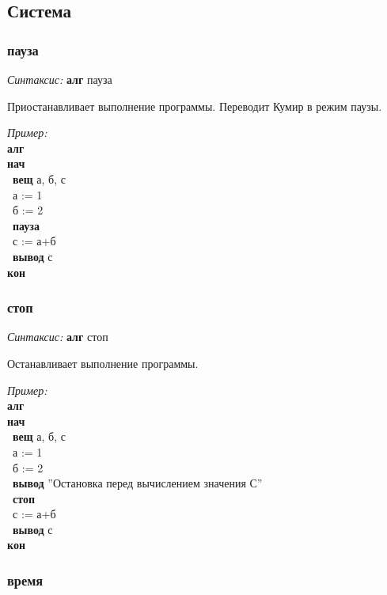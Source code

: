 \documentclass[12pt,a4paper]{article}
\newcommand{\otstup}{\textperiodcentered\ }
\begin{document}
\subsection{Система}

\subsubsection{пауза}

\emph{Синтаксис:} \textbf{алг} пауза


      
       Приостанавливает выполнение программы. Переводит Кумир в режим паузы.
      
\emph{Пример:}      
\sffamily~\\
\textbf{алг}\\ 
\textbf{нач}\\ 
\otstup \textbf{вещ} а, б, с~\\ 
\otstup а := 1~\\ 
\otstup б := 2~\\ 
\otstup \textbf{пауза}~\\ 
\otstup с := а+б~\\ 
\otstup \textbf{вывод} с~\\ 
\textbf{кон}      
  
\normalfont
\subsubsection{стоп}

\emph{Синтаксис:} \textbf{алг} стоп


      
       Останавливает выполнение программы.
      
\emph{Пример:}      
\sffamily~\\
\textbf{алг}\\ 
\textbf{нач}\\
\otstup \textbf{вещ} а, б, с~\\
\otstup а := 1~\\
\otstup б := 2~\\
\otstup \textbf{вывод} ''Остановка перед вычислением значения С''~\\
\otstup \textbf{стоп}~\\
\otstup с := а+б~\\
\otstup \textbf{вывод} с~\\
\textbf{кон}~\\      
  
\normalfont
\subsubsection{время}
\end{document}
